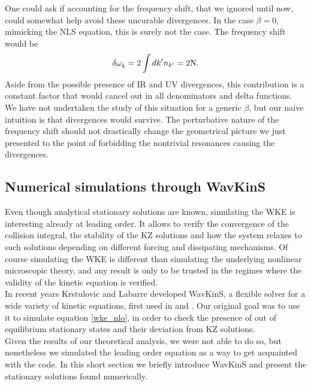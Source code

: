     One could ask if accounting for the frequency shift, that we ignored until now, could somewhat help avoid these uncurable divergences. In the case
    $\beta = 0$, mimicking the NLS equation, this is surely not the case. The frequency shift would be
    \begin{equation}
        \delta \omega^{}_k = 2\int dk' n_{k'} = 2 \mathrm{N}.
    \end{equation}
    Aside from the possible presence of IR and UV divergences, this contribution is a constant factor that would cancel out in all denominators and delta functions.\\
    We have not undertaken the study of this situation for a generic $\beta$, but our naive intuition is that divergences would survive. The perturbative nature of the frequency shift should not drastically change the geometrical picture we just presented to the point of forbidding the nontrivial resonances causing the divergences.\\
    \subsection{Numerical simulations through WavKinS}

    Even though analytical stationary solutions are known, simulating the WKE is interesting already at leading order. It allows to verify the convergence of the collision integral, the stability of the KZ solutions and how the system relaxes to such solutions depending on different forcing and dissipating mechanisms. Of course simulating the WKE is different than simulating the underlying nonlinear microscopic theory, and any result is only to be trusted in the regimes where the validity of the kinetic equation is verified. \\

    In recent years Krstulovic and Labarre developed WavKinS, a flexible solver for a wide variety of kinetic equations, first used in \cite{Giorgio1} and \cite{Giorgio2}. Our original goal was to use it to 
    simulate equation \eqref{wke_nlo}, in order to check the presence of out of equilibrium stationary states and their deviation from KZ solutions.\\
    Given the results of our theoretical analysis, we were not able to do so, but nonetheless we simulated the leading order equation as a way to get acquainted with the code. In this short section we briefly introduce WavKinS and present the stationary solutions found numerically. \\
    
